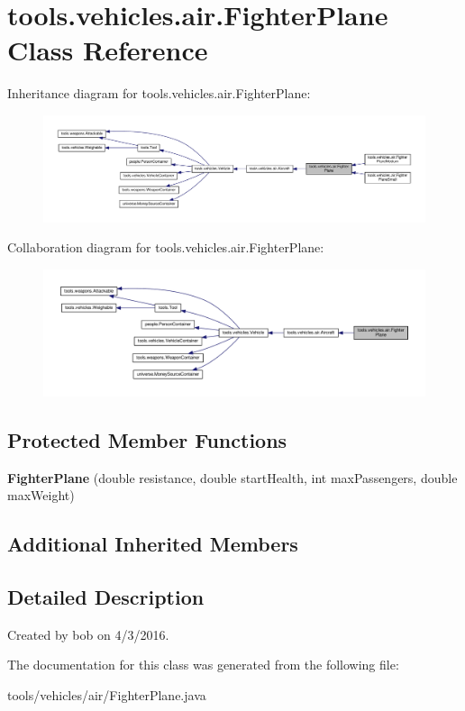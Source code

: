 \hypertarget{classtools_1_1vehicles_1_1air_1_1_fighter_plane}{}\section{tools.\+vehicles.\+air.\+Fighter\+Plane Class Reference}
\label{classtools_1_1vehicles_1_1air_1_1_fighter_plane}


Inheritance diagram for tools.\+vehicles.\+air.\+Fighter\+Plane\+:
\nopagebreak
\begin{figure}[H]
\begin{center}
\leavevmode
\includegraphics[width=350pt]{classtools_1_1vehicles_1_1air_1_1_fighter_plane__inherit__graph}
\end{center}
\end{figure}


Collaboration diagram for tools.\+vehicles.\+air.\+Fighter\+Plane\+:
\nopagebreak
\begin{figure}[H]
\begin{center}
\leavevmode
\includegraphics[width=350pt]{classtools_1_1vehicles_1_1air_1_1_fighter_plane__coll__graph}
\end{center}
\end{figure}
\subsection*{Protected Member Functions}
\begin{DoxyCompactItemize}
\item 
{\bfseries Fighter\+Plane} (double resistance, double start\+Health, int max\+Passengers, double max\+Weight)\hypertarget{classtools_1_1vehicles_1_1air_1_1_fighter_plane_a3ba71060b21d2390c9ec521734b0b341}{}\label{classtools_1_1vehicles_1_1air_1_1_fighter_plane_a3ba71060b21d2390c9ec521734b0b341}

\end{DoxyCompactItemize}
\subsection*{Additional Inherited Members}


\subsection{Detailed Description}
Created by bob on 4/3/2016. 

The documentation for this class was generated from the following file\+:\begin{DoxyCompactItemize}
\item 
tools/vehicles/air/Fighter\+Plane.\+java\end{DoxyCompactItemize}

